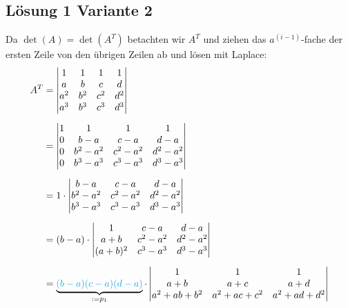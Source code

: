 \documentclass[main.tex]{subfiles}
\begin{document}
\subsection{Lösung 1 Variante 2}
Da $\det (A) = \det (A^T)$ betachten wir $A^T$ und ziehen das $a^{(i-1)}$-fache der ersten Zeile von den übrigen Zeilen ab und lösen mit Laplace:
\begin{align*}
    A^T &=
    \begin{vmatrix}
        1 & 1 & 1 & 1 \\
        a & b & c & d \\
        a^2 & b^2 & c^2 & d^2 \\
        a^3 & b^3 & c^3 & d^3 \\
    \end{vmatrix} \\[2mm]
    &=
    \begin{vmatrix}
        1 & 1 & 1 & 1 \\
        0 & b-a & c-a & d-a \\
        0 & b^2-a^2 & c^2-a^2 & d^2-a^2 \\
        0 & b^3-a^3 & c^3-a^3 & d^3-a^3 \\
    \end{vmatrix} \\[2mm]
    &=
    1 \cdot 
    \begin{vmatrix}
        b-a & c-a & d-a \\
        b^2-a^2 & c^2-a^2 & d^2-a^2 \\
        b^3-a^3 & c^3-a^3 & d^3-a^3 \\
    \end{vmatrix} \\[2mm]
    &= %
    (b-a) \cdot 
    \begin{vmatrix}
        1 & c-a & d-a \\
        a+b & c^2-a^2 & d^2-a^2 \\
        (a+b)^2 & c^3-a^3 & d^3-a^3 \\
    \end{vmatrix} \\[2mm]
    &= \underbrace{\textcolor{Cerulean}{
    {(b-a) (c-a) (d-a)}}}_{:=p_1} \cdot 
    \begin{vmatrix}
              1 &       1 & 1 \\
            a+b &     a+c & a+d \\
        a^2+ab+b^2 & a^2+ac+c^2 & a^2+ad +d^2 \\

\end{vmatrix}
\end{align*}
\end{document}
